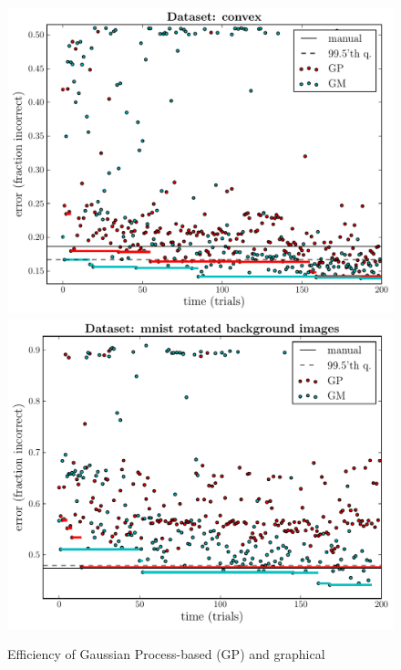 \documentclass{article}
\newcommand{\vs}[1]{\vspace*{-#1mm}}
\begin{document}
\begin{figure}
\centering
\begin{minipage}{0.9\linewidth}
  \vs{0}
    \includegraphics[scale=.35]{figures/plot_histories_gp3,gm_convex.pdf}
    \includegraphics[scale=.35]{figures/plot_histories_gp3,gm_mnist_rotated_background_images.pdf}
  \vs{6}
    \caption{Efficiency of Gaussian Process-based (GP) and graphical
}
\end{minipage}
\end{figure}
\end{document}
